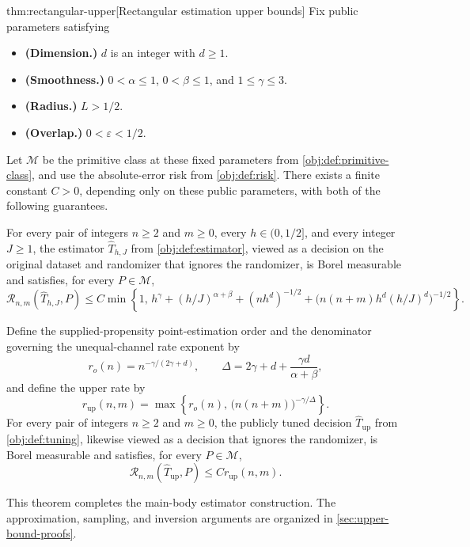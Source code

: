 \begin{theoremv}{thm:rectangular-upper}[Rectangular estimation upper bounds]
Fix public parameters satisfying
\begin{itemize}
\item \textbf{(Dimension.)} \(d\) is an integer with \(d\ge1\).
\item \textbf{(Smoothness.)} \(0<\alpha\le1\), \(0<\beta\le1\), and \(1\le\gamma\le3\).
\item \textbf{(Radius.)} \(L>1/2\).
\item \textbf{(Overlap.)} \(0<\varepsilon<1/2\).
\end{itemize}
Let \(\mathcal M\) be the primitive class at these fixed parameters from \cref{obj:def:primitive-class}, and use the absolute-error risk from \cref{obj:def:risk}. There exists a finite constant \(C>0\), depending only on these public parameters, with both of the following guarantees.

For every pair of integers \(n\ge2\) and \(m\ge0\), every \(h\in(0,1/2]\), and every integer \(J\ge1\), the estimator \(\widehat T_{h,J}\) from \cref{obj:def:estimator}, viewed as a decision on the original dataset and randomizer that ignores the randomizer, is Borel measurable and satisfies, for every \(P\in\mathcal M\),
\[
\mathcal R_{n,m}(\widehat T_{h,J},P)
\le
C\min\left\{
1,\,
h^\gamma+
(h/J)^{\alpha+\beta}+
(nh^d)^{-1/2}+
\bigl(n(n+m)h^d(h/J)^d\bigr)^{-1/2}
\right\}.
\]

Define the supplied-propensity point-estimation order and the denominator governing the unequal-channel rate exponent by
\[
r_o(n)=n^{-\gamma/(2\gamma+d)},
\qquad
\Delta=2\gamma+d+\frac{\gamma d}{\alpha+\beta},
\]
and define the upper rate by
\[
r_{\mathrm{up}}(n,m)
=
\max\left\{
r_o(n),\,
\bigl(n(n+m)\bigr)^{-\gamma/\Delta}
\right\}.
\]
For every pair of integers \(n\ge2\) and \(m\ge0\), the publicly tuned decision \(\widehat T_{\mathrm{up}}\) from \cref{obj:def:tuning}, likewise viewed as a decision that ignores the randomizer, is Borel measurable and satisfies, for every \(P\in\mathcal M\),
\[
\mathcal R_{n,m}(\widehat T_{\mathrm{up}},P)
\le C r_{\mathrm{up}}(n,m).
\]
\end{theoremv}

This theorem completes the main-body estimator construction. The approximation, sampling, and inversion arguments are organized in \cref{sec:upper-bound-proofs}.
